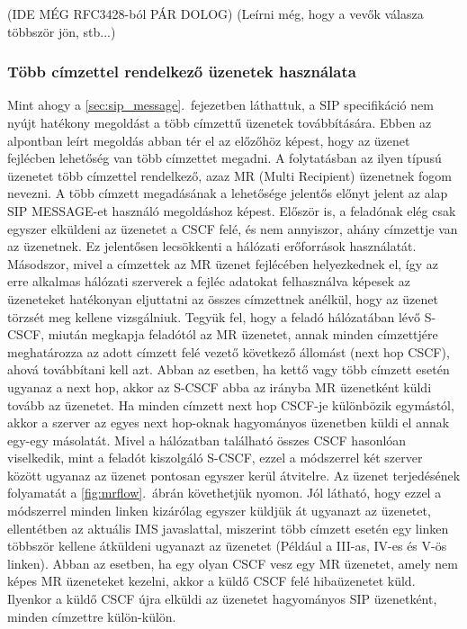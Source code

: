 {\color{red}(IDE MÉG RFC3428-ból PÁR DOLOG)
(Leírni még, hogy a vevők válasza többször jön, stb...)}

\subsubsection{Több címzettel rendelkező üzenetek használata}
\label{sec:mr_message}

Mint ahogy a \ref{sec:sip_message}.~fejezetben láthattuk, a SIP specifikáció nem nyújt hatékony megoldást a több címzettű üzenetek továbbítására. Ebben az alpontban leírt megoldás abban tér el az előzőhöz képest, hogy az üzenet fejlécben lehetőség van több címzettet megadni. A folytatásban az ilyen típusú üzenetet több címzettel rendelkező, azaz MR (Multi Recipient) üzenetnek fogom nevezni. A több címzett megadásának a lehetősége jelentős előnyt jelent az alap SIP MESSAGE-et használó megoldáshoz képest. Először is, a feladónak elég csak egyszer elküldeni az üzenetet a CSCF felé, és nem annyiszor, ahány címzettje van az üzenetnek. Ez jelentősen lecsökkenti a hálózati erőforrások használatát. Másodszor, mivel a címzettek az MR üzenet fejlécében helyezkednek el, így az erre alkalmas hálózati szerverek a fejléc adatokat felhasználva képesek az üzeneteket hatékonyan eljuttatni az összes címzettnek anélkül, hogy az üzenet törzsét meg kellene vizsgálniuk. Tegyük fel, hogy a feladó hálózatában lévő S-CSCF, miután megkapja feladótól az MR üzenetet, annak minden címzettjére meghatározza az adott címzett felé vezető következő állomást (next hop CSCF), ahová továbbítani kell azt. Abban az esetben, ha kettő vagy több címzett esetén ugyanaz a next hop, akkor az S-CSCF abba az irányba MR üzenetként küldi tovább az üzenetet. Ha minden címzett next hop CSCF-je különbözik egymástól, akkor a szerver az egyes next hop-oknak hagyományos üzenetben küldi el annak egy-egy másolatát. Mivel a hálózatban található összes CSCF hasonlóan viselkedik, mint a feladót kiszolgáló S-CSCF, ezzel a módszerrel két szerver között ugyanaz az üzenet pontosan egyszer kerül átvitelre. Az üzenet terjedésének folyamatát a \ref{fig:mrflow}.~ábrán követhetjük nyomon. Jól látható, hogy ezzel a módszerrel minden linken kizárólag egyszer küldjük át ugyanazt az üzenetet, ellentétben az aktuális IMS javaslattal, miszerint több címzett esetén egy linken többször kellene átküldeni ugyanazt az üzenetet (Például a III-as, IV-es és V-ös linken). Abban az esetben, ha egy olyan CSCF vesz egy MR üzenetet, amely nem képes MR üzeneteket kezelni, akkor a küldő CSCF felé hibaüzenetet küld. Ilyenkor a küldő CSCF újra elküldi az üzenetet hagyományos SIP üzenetként, minden címzettre külön-külön. 

